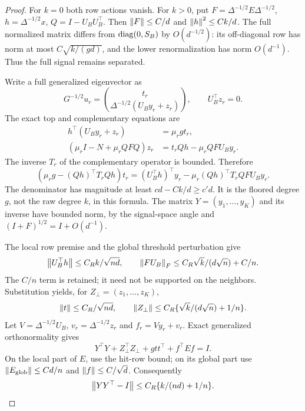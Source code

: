 \begin{proof}
For $k=0$ both row actions vanish. For $k>0$, put
$F=\Delta^{-1/2}E\Delta^{-1/2}$, $h=\Delta^{-1/2}x$,
$Q=I-U_BU_B^\top$. Then $\left\lVert F\right\rVert\le C/d$ and
$\left\lVert h\right\rVert^2\le Ck/d$. The full normalized matrix differs from
$\operatorname{diag}(0,S_B)$ by $O(d^{-1/2})$: its off-diagonal row has norm
at most $C\sqrt{k/(gd)}$, and the lower renormalization has norm
$O(d^{-1})$. Thus the full signal remains separated.

Write a full generalized eigenvector as
\[
 G^{-1/2}u_r=\binom{t_r}{\Delta^{-1/2}(U_By_r+z_r)},
 \qquad U_B^\top z_r=0.
\]
The exact top and complementary equations are
\begin{align*}
 h^\top(U_By_r+z_r)&=\mu_r g t_r,\\
 (\mu_rI-N+\mu_rQFQ)z_r
   &=t_rQh-\mu_rQFU_By_r.
\end{align*}
The inverse $T_r$ of the complementary operator is bounded. Therefore
\[
 (\mu_rg-(Qh)^\top T_rQh)t_r
  =(U_B^\top h)^\top y_r
       -\mu_r(Qh)^\top T_rQFU_By_r.
\]
The denominator has magnitude at least $cd-Ck/d\ge c'd$.
It is the floored degree $g$, not the raw degree $k$, in this formula.
The matrix $Y=(y_1,\ldots,y_K)$ and its inverse have bounded norm,
by the signal-space angle and $(I+F)^{1/2}=I+O(d^{-1})$.

The local row premise and the global threshold perturbation give
\[
 \left\lVert U_B^\top h\right\rVert\le C_Rk/\sqrt{nd},\qquad
 \left\lVert FU_B\right\rVert_F\le C_R\sqrt{k}/(d\sqrt n)+C/n.
\]
The $C/n$ term is retained; it need not be supported on the neighbors.
Substitution yields, for $Z_\perp=(z_1,\ldots,z_K)$,
\begin{equation}\label{restore:loo-refined}
 \left\lVert t\right\rVert\le C_R/\sqrt{nd},\qquad
 \left\lVert Z_\perp\right\rVert\le C_R\{\sqrt{k}/(d\sqrt n)+1/n\}.
\end{equation}
Let $V=\Delta^{-1/2}U_B$, $v_r=\Delta^{-1/2}z_r$ and
$f_r=Vy_r+v_r$. Exact generalized orthonormality gives
\[
 Y^\top Y+Z_\perp^\top Z_\perp+gtt^\top+f^\top Ef=I.
\]
On the local part of $E$, use the hit-row bound; on its global part
use $\left\lVert E_\mathrm{glob}\right\rVert\le Cd/n$ and
$\left\lVert f\right\rVert\le C/\sqrt d$. Consequently
\begin{equation}\label{restore:loo-gram}
 \left\lVert YY^\top-I\right\rVert\le C_R\{k/(nd)+1/n\}.
\end{equation}


\end{proof}
